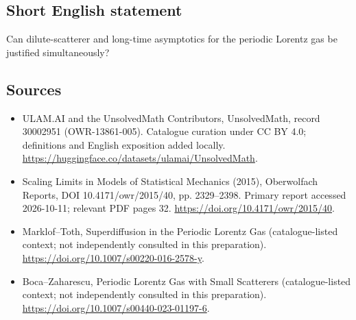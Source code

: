 \documentclass[11pt]{article}
\begin{document}
\subsection{Short English statement}
Can dilute-scatterer and long-time asymptotics for the periodic Lorentz gas be justified simultaneously?
\subsection{Sources}
\begin{itemize}
\item[\hypertarget{source:30002951:1}{S1}] ULAM.AI and the UnsolvedMath Contributors, UnsolvedMath, record 30002951 (OWR-13861-005). Catalogue curation under CC BY 4.0; definitions and English exposition added locally.
\url{https://huggingface.co/datasets/ulamai/UnsolvedMath}.
\item[\hypertarget{source:30002951:2}{S2}] Scaling Limits in Models of Statistical Mechanics (2015), Oberwolfach Reports, DOI 10.4171/owr/2015/40, pp. 2329--2398. Primary report accessed 2026-10-11; relevant PDF pages 32.
\url{https://doi.org/10.4171/owr/2015/40}.
\item[\hypertarget{source:30002951:3}{S3}] Marklof--Toth, Superdiffusion in the Periodic Lorentz Gas (catalogue-listed context; not independently consulted in this preparation).
\url{https://doi.org/10.1007/s00220-016-2578-y}.
\item[\hypertarget{source:30002951:4}{S4}] Boca--Zaharescu, Periodic Lorentz Gas with Small Scatterers (catalogue-listed context; not independently consulted in this preparation).
\url{https://doi.org/10.1007/s00440-023-01197-6}.
\end{itemize}
\label{end:30002951}
\end{document}
